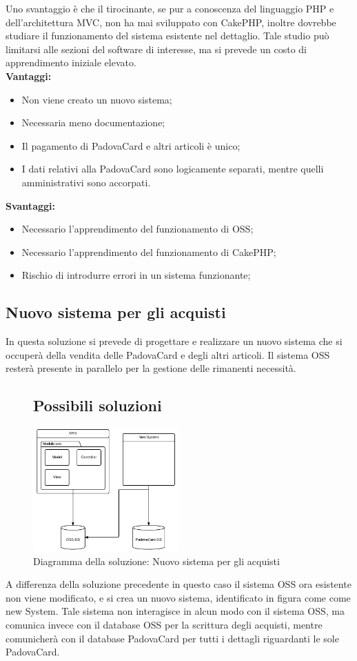 Uno svantaggio è che il tirocinante, se pur a conoscenza del linguaggio PHP e dell'architettura MVC, non ha mai sviluppato con CakePHP, inoltre dovrebbe studiare il funzionamento del sistema esistente nel dettaglio. Tale studio può limitarsi alle sezioni del software di interesse, ma si prevede un costo di apprendimento iniziale elevato.\\
\textbf{Vantaggi:}
\begin{itemize}
\item Non viene creato un nuovo sistema;
\item Necessaria meno documentazione;
\item Il pagamento di PadovaCard e altri articoli è unico;
\item I dati relativi alla PadovaCard sono logicamente separati, mentre quelli amministrativi sono accorpati.
\end{itemize}
\textbf{Svantaggi:}
\begin{itemize}
\item Necessario l'apprendimento del funzionamento di OSS;
\item Necessario l'apprendimento del funzionamento di CakePHP;
\item Rischio di introdurre errori in un sistema funzionante;
\end{itemize}

\subsection{Nuovo sistema per gli acquisti}
In questa soluzione si prevede di progettare e realizzare un nuovo sistema che si occuperà della vendita delle PadovaCard e degli altri articoli. Il sistema OSS resterà presente in parallelo per la gestione delle rimanenti necessità.

\begin{figure}[H]\subsection{Possibili soluzioni}
\centering
\includegraphics[width=0.5\textwidth]{images/Nuovo_sistema_per_gli_acquisti.png}
\caption{Diagramma della soluzione: Nuovo sistema per gli acquisti}
\end{figure}
A differenza della soluzione precedente in questo caso il sistema OSS ora esistente non viene modificato, e si crea un nuovo sistema, identificato in figura come come new System. Tale sistema non interagisce in alcun modo con il sistema OSS, ma comunica invece con il database OSS per la scrittura degli acquisti, mentre comunicherà con il database PadovaCard per tutti i dettagli riguardanti le sole PadovaCard.\\

